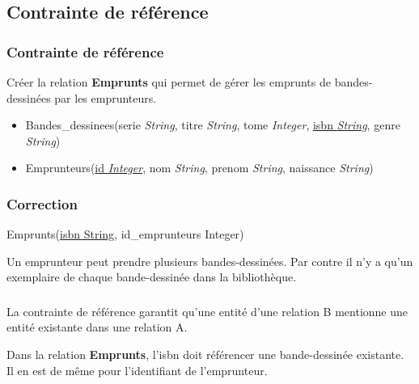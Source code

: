 \documentclass[svgnames,11pt]{beamer}
\begin{document}
\subsection{Contrainte de référence}
\begin{frame}
    \frametitle{Contrainte de référence}

    \begin{activite}
    Créer la relation \textbf{Emprunts} qui permet de gérer les emprunts de bandes-dessinées par les emprunteurs.
    \begin{itemize}
        \item Bandes\_dessinees(serie \emph{String}, titre \emph{String}, tome \emph{Integer}, \underline{isbn \emph{String}}, genre \emph{String})
        \item Emprunteurs(\underline{id \emph{Integer}}, nom \emph{String}, prenom \emph{String}, naissance \emph{String})
    \end{itemize}
    \end{activite}

\end{frame}
\begin{frame}
    \frametitle{Correction}

    \begin{center}
        Emprunts(\underline{isbn String}, id\_emprunteurs Integer)
    \end{center}

    \begin{aretenir}[Remarque]
    Un emprunteur peut prendre plusieurs bandes-dessinées. Par contre il n'y a qu'un exemplaire de chaque bande-dessinée dans la bibliothèque.
    \end{aretenir}
\end{frame}
\begin{frame}
    \frametitle{}

    \begin{aretenir}[]
        La contrainte de référence garantit qu'une entité d'une relation B mentionne une entité existante dans une relation A.
    \end{aretenir}

    Dans la relation \textbf{Emprunts}, l'isbn doit référencer une bande-dessinée existante. Il en est de même pour l'identifiant de l'emprunteur.
\end{frame}
\end{document}
